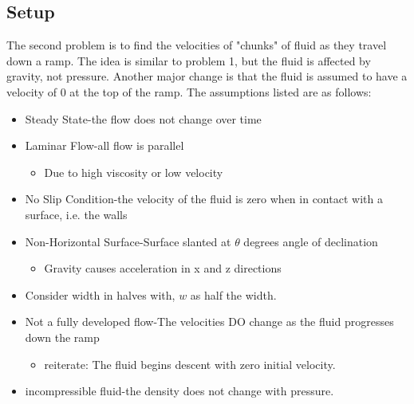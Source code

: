 \documentclass{article}
\begin{document}
	\subsection{Setup}
	The second problem is to find the velocities of "chunks" of fluid as they travel down a ramp. The idea is similar to problem 1, but the fluid is affected by gravity, not pressure. Another major change is that the fluid is assumed to have a velocity of $0$ at the top of the ramp. The assumptions listed are as follows:
	\begin{itemize}
		\item Steady State-the flow does not change over time
		\item Laminar Flow-all flow is parallel
		\begin{itemize}
			\item Due to high viscosity or low velocity
		\end{itemize}
		\item No Slip Condition-the velocity of the fluid is zero when in contact with a surface, i.e. the walls
		\item Non-Horizontal Surface-Surface slanted at $\theta$ degrees angle of declination
		\begin{itemize}
			\item Gravity causes acceleration in x and z directions
		\end{itemize}
		\item Consider width in halves with, $w$ as half the width.
		\item Not a fully developed flow-The velocities DO change as the fluid progresses down the ramp
		\begin{itemize}
			\item reiterate: The fluid begins descent with zero initial velocity.
		\end{itemize}
		\item incompressible fluid-the density does not change with pressure.
	\end{itemize}
\end{document}
